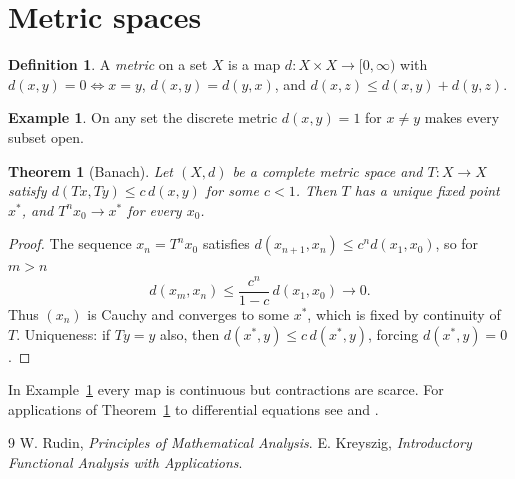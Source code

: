 \documentclass[11pt,a4paper]{article}
\newtheorem{theorem}{Theorem}
\theoremstyle{definition}
\newtheorem{example}{Example}
\newtheorem{definition}{Definition}
\begin{document}
\section{Metric spaces}
\begin{definition}
A \emph{metric} on a set $X$ is a map $d\colon X\times X\to[0,\infty)$ with $d(x,y)=0\iff x=y$, $d(x,y)=d(y,x)$, and $d(x,z)\le d(x,y)+d(y,z)$.
\end{definition}

\begin{example}\label{ex:disc}
On any set the discrete metric $d(x,y)=1$ for $x\ne y$ makes every subset open.
\end{example}

\begin{theorem}[Banach]\label{thm:banach}
Let $(X,d)$ be a complete metric space and $T\colon X\to X$ satisfy $d(Tx,Ty)\le c\,d(x,y)$ for some $c<1$. Then $T$ has a unique fixed point $x^\ast$, and $T^nx_0\to x^\ast$ for every $x_0$.
\end{theorem}
\begin{proof}
The sequence $x_n=T^nx_0$ satisfies $d(x_{n+1},x_n)\le c^nd(x_1,x_0)$, so for $m>n$
\[
d(x_m,x_n)\le\frac{c^n}{1-c}\,d(x_1,x_0)\to0.
\]
Thus $(x_n)$ is Cauchy and converges to some $x^\ast$, which is fixed by continuity of $T$. Uniqueness: if $Ty=y$ also, then $d(x^\ast,y)\le c\,d(x^\ast,y)$, forcing $d(x^\ast,y)=0$.
\end{proof}

In Example~\ref{ex:disc} every map is continuous but contractions are scarce. For applications of Theorem~\ref{thm:banach} to differential equations see \cite[Ch.~3]{rudin} and \cite{kreyszig,rudin}.

\begin{thebibliography}{9}
 W. Rudin, \emph{Principles of Mathematical Analysis}.
 E. Kreyszig, \emph{Introductory Functional Analysis with Applications}.
\end{thebibliography}
\end{document}
